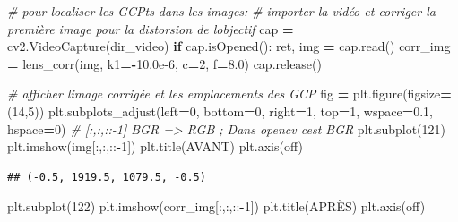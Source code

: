 \documentclass[
]{article}
\newenvironment{Shaded}{\begin{snugshade}}{\end{snugshade}}
\newcommand{\CommentTok}[1]{\textcolor[rgb]{0.56,0.35,0.01}{\textit{#1}}}
\newcommand{\ControlFlowTok}[1]{\textcolor[rgb]{0.13,0.29,0.53}{\textbf{#1}}}
\newcommand{\DecValTok}[1]{\textcolor[rgb]{0.00,0.00,0.81}{#1}}
\newcommand{\FloatTok}[1]{\textcolor[rgb]{0.00,0.00,0.81}{#1}}
\newcommand{\NormalTok}[1]{#1}
\newcommand{\OperatorTok}[1]{\textcolor[rgb]{0.81,0.36,0.00}{\textbf{#1}}}
\newcommand{\StringTok}[1]{\textcolor[rgb]{0.31,0.60,0.02}{#1}}
\begin{document}
\begin{Shaded}
\begin{Highlighting}[]
\CommentTok{\# pour localiser les GCPts dans les images:}
\CommentTok{\# importer la vidéo et corriger la première image pour la distorsion de l\textquotesingle{}objectif}
\NormalTok{cap }\OperatorTok{=}\NormalTok{ cv2.VideoCapture(dir\_video)}
\ControlFlowTok{if}\NormalTok{ cap.isOpened():}
\NormalTok{    ret, img }\OperatorTok{=}\NormalTok{ cap.read()}
\NormalTok{    corr\_img }\OperatorTok{=}\NormalTok{ lens\_corr(img, k1}\OperatorTok{={-}}\FloatTok{10.0e{-}6}\NormalTok{, c}\OperatorTok{=}\DecValTok{2}\NormalTok{, f}\OperatorTok{=}\FloatTok{8.0}\NormalTok{)}
\NormalTok{cap.release()}

\CommentTok{\# afficher l\textquotesingle{}image corrigée et les emplacements des GCP}
\NormalTok{fig }\OperatorTok{=}\NormalTok{ plt.figure(figsize}\OperatorTok{=}\NormalTok{(}\DecValTok{14}\NormalTok{,}\DecValTok{5}\NormalTok{))}
\NormalTok{plt.subplots\_adjust(left}\OperatorTok{=}\DecValTok{0}\NormalTok{, bottom}\OperatorTok{=}\DecValTok{0}\NormalTok{, right}\OperatorTok{=}\DecValTok{1}\NormalTok{, top}\OperatorTok{=}\DecValTok{1}\NormalTok{, wspace}\OperatorTok{=}\FloatTok{0.1}\NormalTok{, hspace}\OperatorTok{=}\DecValTok{0}\NormalTok{)}
\CommentTok{\# [:,:,::{-}1] BGR =\textgreater{} RGB ; Dans opencv c\textquotesingle{}est BGR}
\NormalTok{plt.subplot(}\DecValTok{121}\NormalTok{)}
\NormalTok{plt.imshow(img[:,:,::}\OperatorTok{{-}}\DecValTok{1}\NormalTok{])}
\NormalTok{plt.title(}\StringTok{\textquotesingle{}AVANT\textquotesingle{}}\NormalTok{)}
\NormalTok{plt.axis(}\StringTok{\textquotesingle{}off\textquotesingle{}}\NormalTok{) }
\end{Highlighting}
\end{Shaded}

\begin{verbatim}
## (-0.5, 1919.5, 1079.5, -0.5)
\end{verbatim}

\begin{Shaded}
\begin{Highlighting}[]
\NormalTok{plt.subplot(}\DecValTok{122}\NormalTok{)}
\NormalTok{plt.imshow(corr\_img[:,:,::}\OperatorTok{{-}}\DecValTok{1}\NormalTok{])}
\NormalTok{plt.title(}\StringTok{\textquotesingle{}APRÈS\textquotesingle{}}\NormalTok{)}
\NormalTok{plt.axis(}\StringTok{\textquotesingle{}off\textquotesingle{}}\NormalTok{) }
\end{Highlighting}
\end{Shaded}
\end{document}
